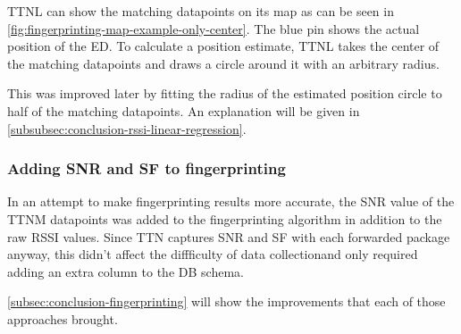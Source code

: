 \ac{TTNL} can show the matching datapoints on its map as can be seen in \cref{fig:fingerprinting-map-example-only-center}.
The blue pin shows the actual position of the \acl{ED}.
To calculate a position estimate, \ac{TTNL} takes the center of the matching datapoints and draws a circle around it with an arbitrary radius.

This was improved later by fitting the radius of the estimated position circle to half of the matching datapoints.
An explanation will be given in \cref{subsubsec:conclusion-rssi-linear-regression}.

\subsubsection{Adding \acf{SNR} and \acf{SF} to fingerprinting}\label{sec:adding-snr-to-fingerprinting}

In an attempt to make fingerprinting results more accurate, the \ac{SNR} value of the \ac{TTNM} datapoints was added to the fingerprinting algorithm in addition to the raw \ac{RSSI} values.
Since \ac{TTN} captures \ac{SNR} and \ac{SF} with each forwarded package anyway, this didn't affect the diffficulty of data collectionand only required adding an extra column to the \ac{DB} schema.

\cref{subsec:conclusion-fingerprinting} will show the improvements that each of those approaches brought.